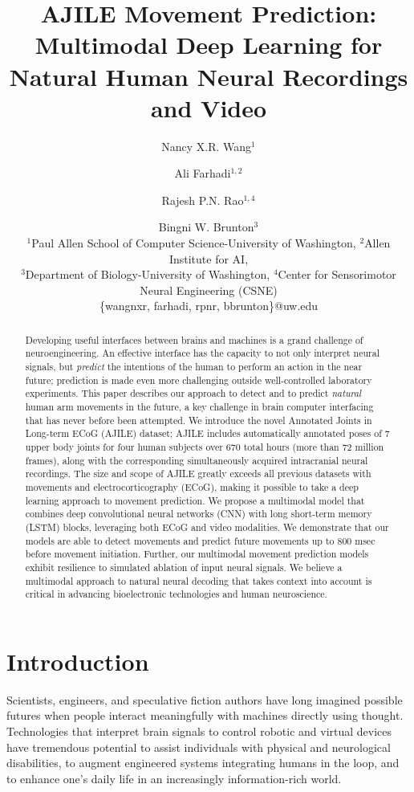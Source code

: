 \documentclass[letterpaper]{article} %
\title{AJILE Movement Prediction: \\Multimodal Deep Learning for Natural Human Neural Recordings and Video}
\author{Nancy X.R. Wang$^1$ \and Ali Farhadi$^{1,2}$ \and Rajesh P.N. Rao$^{1,4}$ \and Bingni W. Brunton$^{3}$\\
$^1$Paul Allen School of Computer Science-University of Washington, $^2$Allen Institute for AI, \\
$^3$Department of Biology-University of Washington, $^4$Center for Sensorimotor Neural Engineering (CSNE) \\ \{wangnxr, farhadi, rpnr, bbrunton\}@uw.edu }
\begin{document}
\maketitle

\begin{abstract}

Developing useful interfaces between brains and machines is a grand challenge of neuroengineering.
An effective interface has the capacity to not only interpret neural signals, but \emph{predict} the intentions of the human to perform an action in the near future; prediction is made even more challenging outside well-controlled laboratory experiments.
This paper describes our approach to detect and to predict \emph{natural} human arm movements in the future, a key challenge in brain computer interfacing that has never before been attempted.
We introduce the novel Annotated Joints in Long-term ECoG (AJILE) dataset; 
AJILE includes automatically annotated poses of 7 upper body joints for four human subjects over 670 total hours (more than 72 million frames), along with the corresponding simultaneously acquired intracranial neural recordings.
The size and scope of AJILE greatly exceeds all previous datasets with movements and electrocorticography (ECoG), making it possible to take a deep learning approach to movement prediction.
We propose a multimodal model that combines deep convolutional neural networks (CNN) with long short-term memory (LSTM) blocks, leveraging both ECoG and video modalities.
We demonstrate that our models are able to detect movements and predict future movements up to 800 msec before movement initiation. %
Further, our multimodal movement prediction models exhibit resilience to simulated ablation of input neural signals. 
We believe a multimodal approach to natural neural decoding that takes context into account is critical in advancing bioelectronic technologies and human neuroscience. 
\end{abstract}

\section{Introduction}


Scientists, engineers, and speculative fiction authors have long imagined possible futures when people interact meaningfully with machines directly using thought.
Technologies that interpret brain signals to control robotic and virtual devices have tremendous potential to assist individuals with physical and neurological disabilities, to augment engineered systems integrating humans in the loop, and to enhance one's daily life in an increasingly information-rich world.
\end{document}
